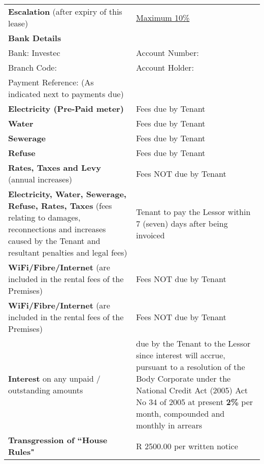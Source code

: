 \documentclass[11pt]{article}
\begin{document}
\begin{table}[ht]
\begin{tabular}{p{0.5\linewidth}p{0.5\linewidth}}
		\textbf{Escalation} (after expiry of this lease) \label{input:escalation-percentage} & \underline{Maximum 10\% \hspace{3em}} \\ [0.8cm]
		\textbf{Bank Details} & \\
		Bank: Investec & Account Number: \\
		Branch Code: & Account Holder: \\
		Payment Reference: (As indicated next to payments due) \\[0.5cm]
		\textbf{Electricity (Pre-Paid meter)} & Fees due by Tenant \\
		\textbf{Water} & Fees due by Tenant \\
		\textbf{Sewerage} & Fees due by Tenant \\
		\textbf{Refuse} & Fees due by Tenant \\
		\textbf{Rates, Taxes and Levy} (annual increases) \label{input:municipal-rates} & Fees NOT due by Tenant \\
		\textbf{Electricity, Water, Sewerage, Refuse, Rates, Taxes} (fees relating to damages, reconnections and increases caused by the Tenant and resultant penalties and legal fees) & Tenant to pay the Lessor within 7 (seven) days after being invoiced \\
		\textbf{WiFi/Fibre/Internet} (are included in the rental fees of the Premises) & Fees NOT due by Tenant \\[1.2cm]
		\textbf{WiFi/Fibre/Internet} (are included in the rental fees of the Premises) & Fees NOT due by Tenant \\[1.2cm]
		\textbf{Interest} on any unpaid / outstanding amounts \label{input:interest}
 & due by the Tenant to the Lessor since interest will accrue, pursuant to a resolution of the Body Corporate under the National Credit Act (2005) Act No 34 of 2005 at present \textbf{2\%} per month, compounded and monthly in arrears \\[0.7cm]
		\textbf{Transgression of ``House Rules"} \label{input:house-rule-fees} & R 2500.00 per written notice
	\end{tabular}
\end{table}
\end{document}
